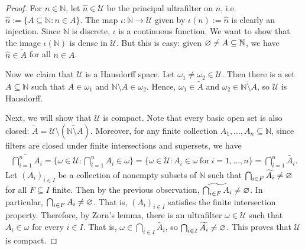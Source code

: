 \documentclass[a4paper,10pt]{report}
\newcommand{\N}{\mathbb{N}}
\begin{document}
\begin{enumerate}
\begin{enumerate}
\begin{proof}
					For $n \in \N$, let $\widehat{n} \in \mathscr{U}$ be the principal ultrafilter
					on $n$, i.e. $\widehat{n} := \{A \subseteq \N : n \in A\}$.
					The map $\iota : \N \to \mathscr{U}$ given by $\iota(n) := \widehat{n}$
					is clearly an injection.
					Since $\N$ is discrete, $\iota$ is a continuous function.
					We want to show that the image $\iota(\N)$ is dense in $\mathscr{U}$.
					But this is easy: given $\es \ne A \subseteq \N$,
					we have $\widehat{n} \in \widetilde{A}$ for all $n \in A$.
					
					Now we claim that $\mathscr{U}$ is a Hausdorff space.
					Let $\omega_1 \ne \omega_2 \in \mathscr{U}$.
					Then there is a set $A \subseteq \N$ such that $A \in \omega_1$
					and $\N \setminus A \in \omega_2$.
					Hence, $\omega_1 \in \widetilde{A}$
					and $\omega_2 \in \widetilde{\N \setminus A}$, so $\mathscr{U}$ is Hausdorff.
					
					Next, we will show that $\mathscr{U}$ is compact.
					Note that every basic open set is also closed:
					$\widetilde{A} = \mathscr{U} \setminus \left( \widetilde{\N \setminus A} \right)$.
					Moreover, for any finite collection $A_1, \dots, A_n \subseteq \N$,
					since filters are closed under finite intersections and supersets, we have
					\begin{align*}
						\widetilde{\bigcap_{i=1}^n{A_i}}
						 = \{\omega \in \mathscr{U} : \bigcap_{i=1}^n{A_i} \in \omega\}
						 = \{\omega \in \mathscr{U} : A_i \in \omega~\text{for}~i = 1, \dots, n\}
						 = \bigcap_{i=1}^n{\widetilde{A_i}}.
					\end{align*}
					Let $(A_i)_{i \in I}$ be a collection of nonempty subsets of $\N$
					such that $\bigcap_{i \in F}{\widetilde{A_i}} \ne \varnothing$ for all $F \subseteq I$ finite.
					Then by the previous observation, $\widetilde{\bigcap_{i \in F}{A_i}} \ne \varnothing$.
					In particular, $\bigcap_{i \in F}{A_i} \ne \varnothing$.
					That is, $(A_i)_{i \in I}$ satisfies the finite intersection property.
					Therefore, by Zorn's lemma, there is an ultrafilter $\omega \in \mathscr{U}$
					such that $A_i \in \omega$ for every $i \in I$.
					That is, $\omega \in \bigcap_{i \in I}{\widetilde{A_i}}$,
					so $\bigcap_{i \in I}{\widetilde{A_i}} \ne \varnothing$.
					This proves that $\mathscr{U}$ is compact.
					

\end{proof}
\end{enumerate}
\end{enumerate}
\end{document}
